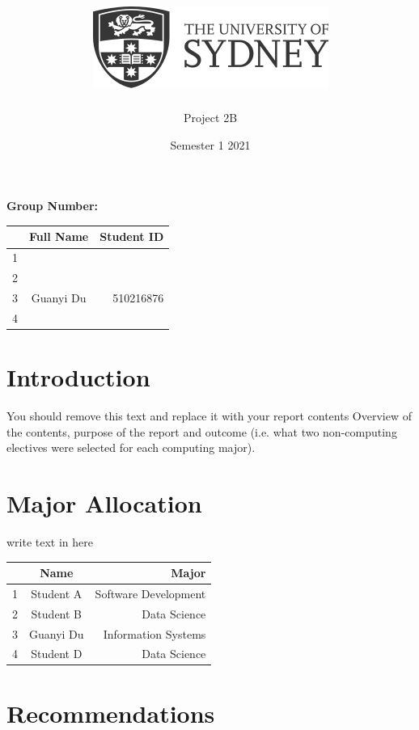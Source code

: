 \documentclass[12pt]{article}
\title{\includegraphics[scale=.5]{usydlogo.png}
\linebreak \\
\noindent \scalebox{1}{\helveticafamily INFO1111: Computing 1A Professionalism}
}
\date{Semester 1 2021}
\author{Project 2B}
\begin{document}
\maketitle
\begin{center}
    \textbf{Group Number:}
\end{center}


\begin{center}
\begin{tabular}{|l|c|r|}
\hline
  & Full Name & Student ID \\ \hline
1 &           &            \\ \hline
2 &           &            \\ \hline
3 & Guanyi Du & 510216876  \\ \hline
4 &           &            \\ \hline
\end{tabular}
\end{center}

\thispagestyle{empty}
\newpage

\tableofcontents %

\setcounter{page}{1}
\newpage
\section{Introduction}
You should remove this text and replace it with your report contents
Overview of the contents, purpose of the report and outcome (i.e. what two non-computing electives were selected for each computing major).

\newpage
\section{Major Allocation}
write text in here
\begin{center}
\begin{tabular}{|l|c|r|}
\hline
  & Name      & Major                \\ \hline
1 & Student A & Software Development \\ \hline
2 & Student B & Data Science        \\ \hline
3 & Guanyi Du & Information Systems  \\ \hline
4 & Student D & Data Science         \\ \hline
\end{tabular}
\end{center}

\newpage
\section{Recommendations}
\end{document}
